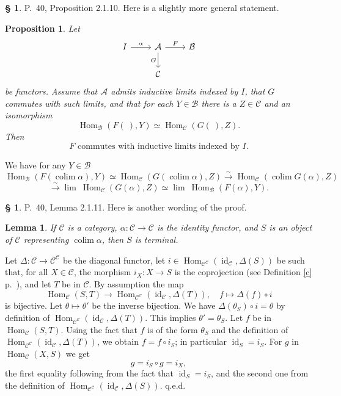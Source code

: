 \documentclass[12pt]{article}
\newtheorem{lem}[thm]{Lemma}
\newtheorem{prop}[thm]{Proposition}
\theoremstyle{remark}
\newtheorem{rk}[thm]{Remark}
\theoremstyle{definition}
\newtheorem{cm}[thm]{\S}
\newcommand{\bc}{\begin{cm}}\newcommand{\ec}{\end{cm}}
\newcommand{\bu}{\bullet}
\newcommand{\n}{\noindent}
\newcommand{\A}{\mathcal A}
\newcommand{\B}{\mathcal B}
\newcommand{\C}{\mathcal C}
\newcommand{\p}{\varphi}
\newcommand{\pf}{\n{\em Proof. }}
\newcommand{\bl}{\begin{lem}}
\newcommand{\el}{\end{lem}}
\newcommand{\bp}{\begin{prop}}
\newcommand{\ep}{\end{prop}}
\DeclareMathOperator*{\coli}{colim}
\DeclareMathOperator{\id}{id}
\DeclareMathOperator{\Hom}{Hom}
\DeclareMathOperator{\h}{Hom}
\DeclareMathOperator{\Ob}{Ob}
\begin{document}

\bc P.~40, Proposition 2.1.10. Here is a slightly more general statement. 
%
\bp 
Let 
$$
\begin{tikzcd}
I\ar{r}{\alpha}&\A\ar{d}[swap]{G}\ar{r}{F}&\B\\
&\C
\end{tikzcd}
$$
be functors. Assume that $\A$ admits inductive limits indexed by $I$, that $G$ commutes with such limits, and that for each $Y\in\B$ there is a $Z\in\C$ and an isomorphism 
$$
\Hom_\B(F(\ ),Y)\simeq\Hom_\C(G(\ ),Z). 
$$
Then 
\begin{equation}\label{2.1.10}
F\text{ commutes with inductive limits indexed by }I.
\end{equation}
\ep
%
\pf We have for any $Y\in\B$ 
$$ 
\Hom_\B\left(F\left(\coli\alpha\right),Y\right)\simeq
\Hom_\C\left(G\left(\coli\alpha\right),Z\right)
\overset{\sim}{\to}
\Hom_\C\left(\coli G(\alpha),Z\right)
$$
$$
\overset{\sim}{\to}\lim \ \Hom_\C(G(\alpha),Z)\simeq\lim \ \Hom_\B(F(\alpha),Y).
$$
\ec 


\bc P.~40, Lemma 2.1.11. Here is another wording of the proof. 
%
\bl 
If $\C$ is a category, $\alpha:\C\to\C$ is the identity functor, and $S$ is an object of $\C$ representing $\coli\alpha$, then $S$ is terminal. 
\el
%
\pf Let $\Delta:\C\to\C^\C$ be the diagonal functor, let $i\in\h_{\C^\C}(\id_\C,\Delta(S))$ be such that, for all $X\in\C$, the morphism $i_X:X\to S$ is the coprojection (see Definition \ref{c} p.~\pageref{c}), and let $T$ be in $\C$. By assumption the map 
$$
\h_\C(S,T)\to\h_{\C^\C}(\id_\C,\Delta(T)),\quad f\mapsto\Delta(f)\circ i 
$$ 
is bijective. Let $\theta\mapsto\theta'$ be the inverse bijection. We have $\Delta(\theta_S)\circ i=\theta$ by definition of $\h_{\C^\C}(\id_\C,\Delta(T))$. This implies $\theta'=\theta_S$. Let $f$ be in $\h_\C(S,T)$. Using the fact that $f$ is of the form $\theta_S$ and the definition of $\h_{\C^\C}(\id_\C,\Delta(T))$, we obtain $f=f\circ i_S$; in particular $\id_S=i_S$. For $g$ in $\h_\C(X,S)$ we get 
$$
g=i_S\circ g=i_X,
$$
the first equality following from the fact that $\id_S=i_S$, and the second one from the definition of $\h_{\C^\C}(\id_\C,\Delta(S))$. q.e.d.
\ec 


\end{document}
